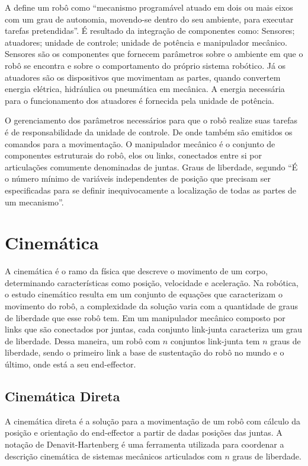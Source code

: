 A \cite{iso2012} define um robô como “mecanismo programável atuado em dois ou mais eixos com um grau de autonomia, movendo-se dentro do seu ambiente, para executar tarefas pretendidas”. É resultado da integração de componentes como: Sensores; atuadores; unidade de controle; unidade de potência e manipulador mecânico. Sensores são os componentes que fornecem parâmetros sobre o ambiente em que o robô se encontra e sobre o comportamento do próprio sistema robótico. Já os atuadores são os dispositivos que movimentam as partes, quando convertem energia elétrica, hidráulica ou pneumática em mecânica. A energia necessária para o funcionamento dos atuadores é fornecida pela unidade de potência.

O gerenciamento dos parâmetros necessários para que o robô realize suas tarefas é de responsabilidade da unidade de controle. De onde também são emitidos os comandos para a movimentação. O manipulador mecânico é o conjunto de componentes estruturais do robô, elos ou links, conectados entre si por articulações comumente denominadas de juntas. Graus de liberdade, segundo \cite{romanorobotica} “É o número mínimo de variáveis independentes de posição que precisam ser especificadas para se definir inequivocamente a localização de todas as partes de um mecanismo”.

\section{Cinemática}\label{sec:cinem}
A cinemática é o ramo da física que descreve o movimento de um corpo, determinando características como posição, velocidade e aceleração. Na robótica, o estudo cinemático resulta em um conjunto de equações que caracterizam o movimento do robô, a complexidade da solução varia com a quantidade de graus de liberdade que esse robô tem. Em um manipulador mecânico composto por links que são conectados por juntas, cada conjunto link-junta caracteriza um grau de liberdade. Dessa maneira, um robô com $n$ conjuntos link-junta tem $n$ graus de liberdade, sendo o primeiro link a base de sustentação do robô no mundo e o último, onde está a seu end-effector.

\subsection{Cinemática Direta}\label{sec:cinem_dir}
A cinemática direta é a solução para a movimentação de um robô com cálculo da posição e orientação do end-effector a partir de dadas posições das juntas. A notação de Denavit-Hartenberg é uma ferramenta utilizada para coordenar a descrição cinemática de sistemas mecânicos articulados com $n$ graus de liberdade.

